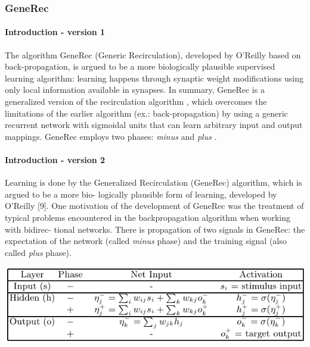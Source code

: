 \subsubsection{GeneRec}

\paragraph{Introduction - version 1} 
The algorithm GeneRec (Generic Recirculation), developed by O’Reilly \citet{o1996bio} based on back-propagation, is argued to be a more biologically plausible supervised learning algorithm: learning happens through synaptic weight modifications using only local information available in synapses. In summary, GeneRec is a generalized version of the recirculation algorithm \citet{hinton1988learning}, which overcomes the limitations of the earlier algorithm (ex.: back-propagation) by using a generic recurrent network with sigmoidal units that can learn arbitrary input and output mappings. GeneRec employs two phases: \emph{minus} and \emph{plus} \citet{da2011advances}. 

\paragraph{Introduction - version 2} 
Learning is done by the Generalized Recirculation
(GeneRec) algorithm, which is argued to be a more bio-
logically plausible form of learning, developed by O’Reilly
[9]. One motivation of the development of GeneRec was
the treatment of typical problems encountered in the
backpropagation algorithm when working with bidirec-
tional networks. There is propagation of two signals in
GeneRec: the expectation of the network (called \emph{minus}
phase) and the training signal (also called \emph{plus} phase).
\citet{schneider2009application} 


\begin{center} 
\includegraphics{img/table_generec.png} \citet{farkas2013bal}
\end{center} 

